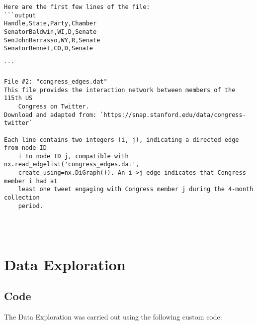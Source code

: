\documentclass[11pt]{article}
\begin{document}
\begin{Verbatim}[tabsize=4]
Here are the first few lines of the file:
```output
Handle,State,Party,Chamber
SenatorBaldwin,WI,D,Senate
SenJohnBarrasso,WY,R,Senate
SenatorBennet,CO,D,Senate

```

File #2: "congress_edges.dat"
This file provides the interaction network between members of the 115th US
	Congress on Twitter.
Download and adapted from: `https://snap.stanford.edu/data/congress-twitter`

Each line contains two integers (i, j), indicating a directed edge from node ID
	i to node ID j, compatible with nx.read_edgelist('congress_edges.dat',
	create_using=nx.DiGraph()). An i->j edge indicates that Congress member i had at
	least one tweet engaging with Congress member j during the 4-month collection
	period.




\end{Verbatim}

\section{Data Exploration}
\subsection{{Code}}
The Data Exploration was carried out using the following custom code:
\end{document}

